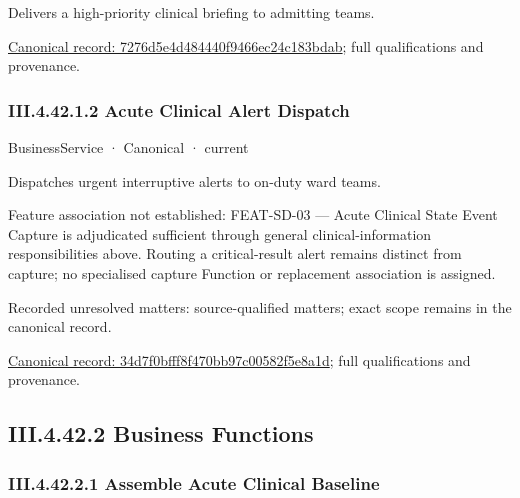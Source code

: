 Delivers a high-priority clinical briefing to admitting teams.


{\footnotesize \href{../../../../continuum/business/business-service/7276d5e4d484440f9466ec24c183bdab.md}{Canonical record: 7276d5e4d484440f9466ec24c183bdab}; full qualifications and provenance.}\par
\subsubsection*{III.4.42.1.2 Acute Clinical Alert Dispatch}
\label{navigation:III.4.42.1.2}

\label{element:34d7f0bfff8f470bb97c00582f5e8a1d}
{\small BusinessService · Canonical · current}\par

Dispatches urgent interruptive alerts to on-duty ward teams.



Feature association not established: FEAT-SD-03 — Acute Clinical State Event Capture is adjudicated sufficient through general clinical-information responsibilities above. Routing a critical-result alert remains distinct from capture; no specialised capture Function or replacement association is assigned.


{\small Recorded unresolved matters: source-qualified matters; exact scope remains in the canonical record.}\par
{\footnotesize \href{../../../../continuum/business/business-service/34d7f0bfff8f470bb97c00582f5e8a1d.md}{Canonical record: 34d7f0bfff8f470bb97c00582f5e8a1d}; full qualifications and provenance.}\par
\subsection*{III.4.42.2 Business Functions}
\label{navigation:III.4.42.2}

\subsubsection*{III.4.42.2.1 Assemble Acute Clinical Baseline}
\label{navigation:III.4.42.2.1}

